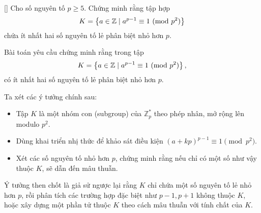 \documentclass[../05-modular-arithmetic-a.tex]{subfiles}
\begin{document}
\begin{example*}\label{example:FRA-2015-RMM-P3}[\textbf{}]
	Cho số nguyên tố \( p \geq 5 \). Chứng minh rằng tập hợp
	\[
		K = \left\{ a \in \mathbb{Z} \mid a^{p-1} \equiv 1 \ (\mathrm{mod}\ p^2) \right\}
	\]
	chứa ít nhất hai số nguyên tố lẻ phân biệt nhỏ hơn \( p \).
\end{example*}

\begin{story*}
    Bài toán yêu cầu chứng minh rằng trong tập
    \[
        K = \left\{ a \in \mathbb{Z} \mid a^{p-1} \equiv 1 \ (\mathrm{mod}\ p^2) \right\},
    \]
    có ít nhất hai số nguyên tố lẻ phân biệt nhỏ hơn \( p \).  

    Ta xét các ý tưởng chính sau:
    \begin{itemize}[topsep=0pt, partopsep=0pt, itemsep=0pt]
        \item Tập \( K \) là một nhóm con (subgroup) của \( \mathbb{Z}_p^* \) theo phép nhân, mở rộng lên modulo \( p^2 \).
        \item Dùng khai triển nhị thức để khảo sát điều kiện \( (a + kp)^{p-1} \equiv 1 \pmod{p^2} \).
        \item Xét các số nguyên tố nhỏ hơn \( p \), chứng minh rằng nếu chỉ có một số như vậy thuộc \( K \), sẽ dẫn đến mâu thuẫn.
    \end{itemize}

    Ý tưởng then chốt là giả sử ngược lại rằng \( K \) chỉ chứa một số nguyên tố lẻ nhỏ hơn \( p \), rồi phân tích các trường hợp đặc biệt như \( p-1, p+1 \) không thuộc \( K \), hoặc xây dựng một phần tử thuộc \( K \) theo cách mâu thuẫn với tính chất của \( K \).
\end{story*}

\bigbreak
\end{document}
